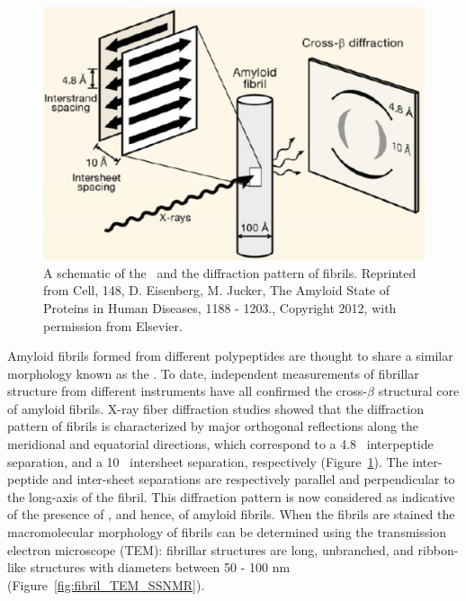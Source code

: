 \begin{figure}
 \centering
 \includegraphics[width=5in]{figures/introduction/fibril_structure_diffraction.pdf}
 \caption[Characteristic cross-$\beta$ spacings from X-ray fibre diffraction studies of amyloid fibrils]{A schematic of the \crossbs\ and the diffraction pattern of fibrils. Reprinted from Cell, 148, D. Eisenberg, M. Jucker, The Amyloid State of Proteins in Human Diseases, 1188 - 1203., Copyright 2012, with permission from Elsevier.}
 \label{fig:fibril_diffraction}
\end{figure}

Amyloid fibrils formed from different polypeptides are thought to share a similar morphology known as the \crossbs.\cite{Chiti:2006fz} To date, independent measurements of fibrillar structure from different instruments have all confirmed the cross-$\beta$ structural core of amyloid fibrils. X-ray fiber diffraction studies showed that the diffraction pattern of fibrils is characterized by major orthogonal reflections along the meridional and equatorial directions, which correspond to a 4.8 \angstrom\ interpeptide separation, and a 10 \angstrom\ intersheet separation, respectively (Figure~\ref{fig:fibril_diffraction}).\cite{Sunde:1997cq,Makin:2005un,Sipe:2000fs} The inter-peptide and inter-sheet separations are respectively parallel and perpendicular to the long-axis of the fibril. This diffraction pattern is now considered as indicative of the presence of \crossbs, and hence, of amyloid fibrils.\cite{Chiti:2006fz} When the fibrils are stained the macromolecular morphology of fibrils can be determined using the transmission electron microscope (TEM): fibrillar structures are long, unbranched, and ribbon-like structures with diameters between 50 - 100 nm (Figure~\ref{fig:fibril_TEM_SSNMR}).\cite{Chiti:2006fz} 

